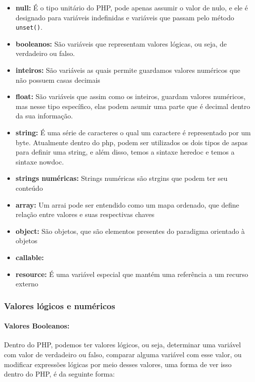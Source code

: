 \documentclass[12pt a4paper]{paper}
\begin{document}
\begin{itemize}
    \item \textbf{null:} É o tipo unitário do PHP, pode apenas assumir o valor de nulo, e ele é designado para variáveis indefinidas e variáveis que passam pelo método \texttt{unset()}. 
    \item \textbf{booleanos:} São variáveis que representam valores lógicas, ou seja, de verdadeiro ou falso.
    \item \textbf{inteiros:} São variáveis as quais permite guardamos valores numéricos que não possuem casas decimais
    \item \textbf{float:} São variáveis que assim como os inteiros, guardam valores numéricos, mas nesse tipo específico, elas podem asumir uma parte que é decimal dentro da sua informação.
    \item \textbf{string:} É uma série de caracteres o qual um caractere é representado por um byte. Atualmente dentro do php, podem ser utilizados os dois tipos de aspas para definir uma string, e além disso, temos a sintaxe heredoc e temos a sintaxe nowdoc.
    \item \textbf{strings numéricas:} Strings numéricas são strgins que podem ter seu conteúdo   
    \item \textbf{array:} Um arrai pode ser entendido como um mapa ordenado, que define relação entre valores e suas respectivas chaves
    \item \textbf{object:} São objetos, que são elementos presentes do paradigma orientado à objetos 
    \item \textbf{callable:} 
    \item \textbf{resource:} É uma variável especial que mantém uma referência a um recurso externo 
\end{itemize}

\subsubsection{Valores lógicos e numéricos} %
\label{sec:Valores lógicos e numéricos}

\paragraph{Valores Booleanos: } %
\label{par:Valores Booleanos: }
Dentro do PHP, podemos ter valores lógicos, ou seja, determinar uma variável com valor 
de verdadeiro ou falso, comparar alguma variável com esse valor, ou modificar 
expressões lógicas por meio desses valores, uma forma de ver isso dentro do PHP, é da 
seguinte forma:
\end{document}
